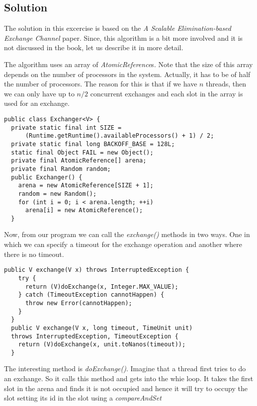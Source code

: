 \subsection{Solution}
\par
The solution in this excercise is based on the \textit{A Scalable
Elimination-based Exchange Channel} paper. Since, this algorithm is a bit more
involved and it is not discussed in the book, let us describe it in more detail.
\par
The algorithm uses an array of \textit{AtomicReference}s. Note that the size of
this array depends on the number of processors in the system. Actually, it has
to be of half the number of processors. The reason for this is that if we have
$n$ threads, then we can only have up to $n/2$ concurrent exchanges and each
slot in the array is used for an exchange.
\par
\hfill
\begin{lstlisting}[style=numbers]
public class Exchanger<V> {
  private static final int SIZE =
      (Runtime.getRuntime().availableProcessors() + 1) / 2;
  private static final long BACKOFF_BASE = 128L;
  static final Object FAIL = new Object();
  private final AtomicReference[] arena;
  private final Random random;
  public Exchanger() {
    arena = new AtomicReference[SIZE + 1];
    random = new Random();
    for (int i = 0; i < arena.length; ++i)
      arena[i] = new AtomicReference();
  }
\end{lstlisting}
\hfill
\par
Now, from our program we can call the \textit{exchange()} methods in two ways.
One in which we can specify a timeout for the exchange operation and another
where there is no timeout.
\par
\hfill
\begin{lstlisting}[style=numbers]
  public V exchange(V x) throws InterruptedException {
    try {
      return (V)doExchange(x, Integer.MAX_VALUE);
    } catch (TimeoutException cannotHappen) {
      throw new Error(cannotHappen);
    }
  }
  public V exchange(V x, long timeout, TimeUnit unit)
  throws InterruptedException, TimeoutException {
    return (V)doExchange(x, unit.toNanos(timeout));
  }
\end{lstlisting}
\hfill
\par
The interesting method is \textit{doExchange()}. Imagine that a thread first
tries to do an exchange. So it calls this method and gets into the whie loop. It
takes the first slot in the arena and finds it is not occupied and hence it will
try to occupy the slot setting its id in the slot using a \textit{compareAndSet}
